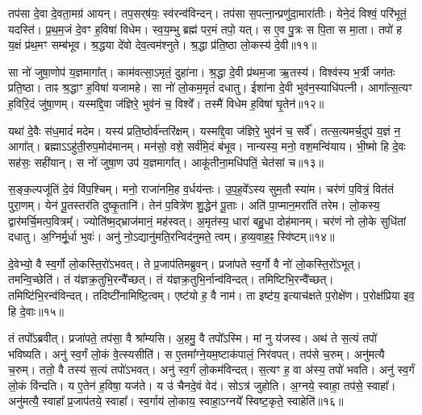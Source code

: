    तप॑सा दे॒वा दे॒वता॒मग्र॑ आयन्।
   तप॒सर्‌ष॑यः॒ स्व॑रन्व॑विन्दन्।
   तप॑सा स॒पत्ना॒न्प्रणु॑दा॒मारा॑तीः।
   येने॒दं विश्वं॒ परि॑भूतं॒ यदस्ति॑।
   प्र॒थ॒म॒जं दे॒वꣳ ह॒विषा॑ विधेम।
   स्व॒य॒म्भु ब्रह्म॑ पर॒मं तपो॒ यत्।
   स ए॒व पु॒त्रः स पि॒ता स मा॒ता।
   तपो॑ ह य॒क्षं प्र॑थ॒मꣳ सम्ब॑भूव।
   श्र॒द्धया दे॑वो देव॒त्वम॑श्नुते।
   श्र॒द्धा प्र॑ति॒ष्ठा लो॒कस्य॑ दे॒वी॥११॥

   सा नो॑ जुषा॒णोप॑ य॒ज्ञमागा᳚त्।
   काम॑वत्सा॒ऽमृतं॒ दुहा॑ना।
   श्र॒द्धा दे॒वी प्र॑थम॒जा ऋ॒तस्य॑।
   विश्व॑स्य भ॒र्त्री जग॑तः प्रति॒ष्ठा।
   ताꣴ श्र॒द्धाꣳ ह॒विषा॑ यजामहे।
   सा नो॑ लो॒कम॒मृतं॑ दधातु।
   ईशा॑ना दे॒वी भुव॑न॒स्याधि॑पत्नी।
   आगा᳚त्स॒त्यꣳ ह॒विरि॒दं जु॑षा॒णम्।
   यस्मा᳚द्दे॒वा ज॑ज्ञिरे॒ भुव॑नं च॒ विश्वे᳚।
   तस्मै॑ विधेम ह॒विषा॑ घृ॒तेन॑॥१२॥

   यथा॑ दे॒वैः स॑ध॒मादं॑ मदेम।
   यस्य॑ प्रति॒ष्ठोर्व॑न्तरि॑क्षम्।
   यस्मा᳚द्दे॒वा ज॑ज्ञिरे॒ भुव॑नं च॒ सर्वे᳚।
   तत्स॒त्यमर्च॒दुप॑ य॒ज्ञं न॒ आगा᳚त्।
   ब्रह्माऽऽहु॑ती॒रुप॒मोद॑मानम्।
   मन॑सो॒ वशे॒ सर्व॑मि॒दं ब॑भूव।
   नान्यस्य॒ मनो॒ वश॒मन्वि॑याय।
   भी॒ष्मो हि दे॒वः सह॑सः॒ सही॑यान्।
   स नो॑ जुषा॒ण उप॑ य॒ज्ञमागा᳚त्।
   आकू॑तीना॒मधि॑पतिं॒ चेत॑सां च॥१३॥

   स॒ङ्क॒ल्पजू॑तिं दे॒वं वि॑प॒श्चिम्।
   मनो॒ राजा॑नमि॒ह व॒र्धय॑न्तः।
   उ॒प॒ह॒वे᳚ऽस्य सुम॒तौ स्या॑म।
   चर॑णं प॒वित्रं॒ वित॑तं पुरा॒णम्।
   येन॑ पू॒तस्तर॑ति दुष्कृ॒तानि॑।
   तेन॑ प॒वित्रे॑ण शु॒द्धेन॑ पू॒ताः।
   अति॑ पा॒प्मान॒मरा॑तिं तरेम।
   लो॒कस्य॒ द्वार॑मर्चि॒मत्प॒वित्रम्᳚।
   ज्योति॑ष्म॒द्भ्राज॑मानं॒ मह॑स्वत्।
   अ॒मृत॑स्य॒ धारा॑ बहु॒धा दोह॑मानम्।
   चर॑णं नो लो॒के सुधि॑तां दधातु।
   अ॒ग्निर्मू॒र्धा भुवः॑।
   अनु॑ नो॒ऽद्यानु॑मति॒रन्विद॑नुमते॒ त्वम्।
   ह॒व्य॒वाह॒ꣴ॒ स्वि॑ष्टम्॥१४॥\anuvakamend
  
   दे॒वेभ्यो॒ वै स्व॒र्गो लो॒कस्ति॒रो॑ऽभवत्।
   ते प्र॒जाप॑तिमब्रुवन्।
   प्रजा॑पते स्व॒र्गो वै नो॑ लो॒कस्ति॒रो॑ऽभूत्।
   तमन्वि॒च्छेति॑।
   तं य॑ज्ञक्र॒तुभि॒रन्वै᳚च्छत्।
   तं य॑ज्ञक्र॒तुभि॒र्नान्व॑विन्दत्।
   तमिष्टिभि॒\-रन्वै᳚च्छत्।
   तमिष्टि॑भि॒रन्व॑विन्दत्।
   तदिष्टी॑नामिष्टि॒त्वम्।
   एष्ट॑यो ह॒ वै नाम॑।
   ता इष्ट॑य॒ इत्याच॑क्षते प॒रोक्षे॑ण।
   प॒रोक्ष॑प्रिया इव॒ हि दे॒वाः॥१५॥

   तं तपो᳚ऽब्रवीत्।
   प्रजा॑पते॒ तप॑सा॒ वै श्रा᳚म्यसि।
   अ॒हमु॒ वै तपो᳚ऽस्मि।
   मां नु य॑जस्व।
   अथ॑ ते स॒त्यं तपो॑ भविष्यति।
   अनु॑ स्व॒र्गं लो॒कं वे॒त्स्यसीति॑।
   स ए॒तमा᳚ग्ने॒यम॒ष्टाक॑पालं॒ निर॑वपत्।
   तप॑से च॒रुम्।
   अनु॑मत्यै च॒रुम्।
   ततो॒ वै तस्य॑ स॒त्यं तपो॑ऽभवत्।
   अनु॑ स्व॒र्गं लो॒कम॑विन्दत्।
   स॒त्यꣳ ह॒ वा अ॑स्य॒ तपो॑ भवति।
   अनु॑ स्व॒र्गं लो॒कं वि॑न्दति।
   य ए॒तेन॑ ह॒विषा॒ यज॑ते।
   य उ॑ चैनदे॒वं वेद॑।
   सोऽत्र॑ जुहोति।
   अ॒ग्नये॒ स्वाहा॒ तप॑से॒ स्वाहा᳚।
   अनु॑मत्यै॒ स्वाहा᳚ प्र॒जाप॑तये॒ स्वाहा᳚।
   स्व॒र्गाय॑ लो॒काय॒ स्वाहा॒ऽग्नये᳚ स्विष्ट॒कृते॒ स्वाहेति॑॥१६॥

